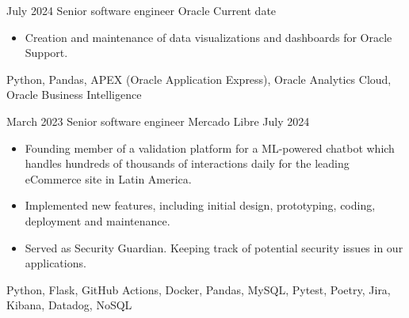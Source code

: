 %
%
%


\begin{experiences}

    \experience
        {July 2024}
        {Senior software engineer}
        {Oracle}
        {Current date}
        {
            \begin{itemize}
                \item Creation and maintenance of data visualizations and dashboards for Oracle Support.
            \end{itemize}
        }
        {
            Python,
            Pandas,
            APEX (Oracle Application Express),
            Oracle Analytics Cloud,
            Oracle Business Intelligence
        }

    \emptySeparator

    \experience
        {March 2023}
        {Senior software engineer}
        {Mercado Libre}
        {July 2024}
        {
            \begin{itemize}
                \item Founding member of a validation platform for a ML-powered chatbot which handles hundreds of thousands of interactions daily for the leading eCommerce site in Latin America.
                \item Implemented new features, including initial design, prototyping, coding, deployment and maintenance.
                \item Served as Security Guardian. Keeping track of potential security issues in our applications.
            \end{itemize}
        }
        {
            Python,
            Flask,
            GitHub Actions,
            Docker,
            Pandas,
            MySQL,
            Pytest,
            Poetry,
            Jira,
            Kibana,
            Datadog,
            NoSQL
        }

    \emptySeparator



\end{experiences}
